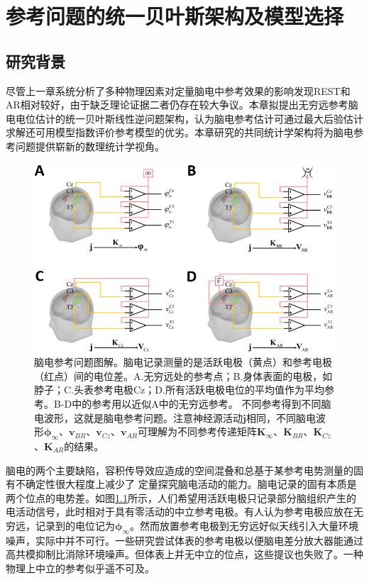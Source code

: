 \chapter{参考问题的统一贝叶斯架构及模型选择}
\section{研究背景}
尽管上一章系统分析了多种物理因素对定量脑电中参考效果的影响发现REST和AR相对较好，由于缺乏理论证据二者仍存在较大争议。本章拟提出无穷远参考脑电电位估计的统一贝叶斯线性逆问题架构，认为脑电参考估计可通过最大后验估计求解还可用模型指数评价参考模型的优劣。本章研究的共同统计学架构将为脑电参考问题提供崭新的数理统计学视角。
\begin{figure}[!h]
	\centering
	\includegraphics[width=15cm]{pic/Frontier/figure1.png}
	\caption{脑电参考问题图解。脑电记录测量的是活跃电极（黄点）和参考电极（红点）间的电位差。A.无穷远处的参考点；B.身体表面的电极，如脖子；C.头表参考电极Cz；D.所有活跃电极电位的平均值作为平均参考。B-D中的参考用以近似A中的无穷远参考。 不同参考得到不同脑电波形，这就是脑电参考问题。注意神经源活动$\mathbf{j}$相同，不同脑电波形$\mathbf{\phi}_\infty$、$\mathbf{v}_{BR}$、$\mathbf{v}_{Cz}$、$\mathbf{v}_{AR}$可理解为不同参考传递矩阵$\mathbf{K}_\infty$、$\mathbf{K}_{BR}$、$\mathbf{K}_{Cz}$、$\mathbf{K}_{AR}$的结果。}
	\label{3:1}
\end{figure}
脑电的两个主要缺陷，容积传导效应造成的空间混叠和总基于某参考电势测量的固有不确定性很大程度上减少了
定量探究脑电活动的能力。脑电记录的固有本质是两个位点的电势差。如图\ref{3:1}所示，人们希望用活跃电极只记录部分脑组织产生的电活动信号，此时相对于具有零活动的中立参考电极。有人认为参考电极应放在无穷远，记录到的电位记为$\mathbf{\phi}_{\infty}$。然而放置参考电极到无穷远好似天线引入大量环境噪声，实际中并不可行。一些研究尝试体表的参考电极以便脑电差分放大器能通过高共模抑制比消除环境噪声。但体表上并无中立的位点，这些提议也失败了。一种物理上中立的参考似乎遥不可及。

